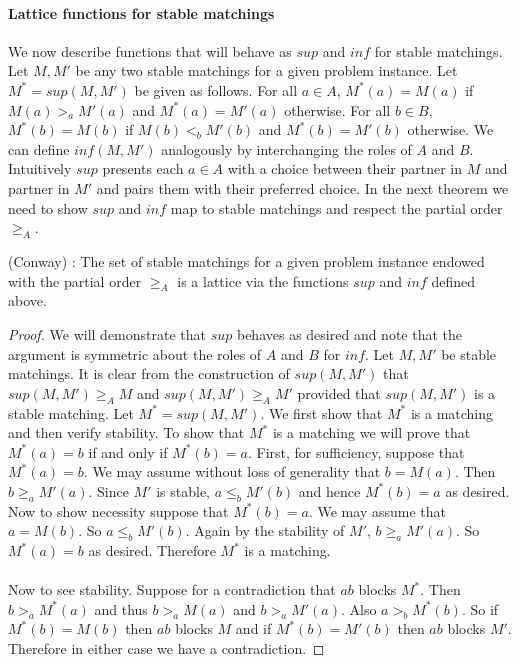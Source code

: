 \paragraph{Lattice functions for stable matchings} We now describe functions that will behave as $sup$ and $inf$ for stable matchings. Let $M, M'$ be any two stable matchings for a given problem instance. Let $M^* = sup(M,M')$ be given as follows. For all $a \in A$, $M^*(a) = M(a)$ if $M(a) >_a M'(a)$ and $M^*(a) = M'(a)$ otherwise. For all $b \in B$, $M^*(b) = M(b)$ if $M(b) <_b M'(b)$ and $M^*(b) = M'(b)$ otherwise. We can define $inf(M,M')$ analogously by interchanging the roles of $A$ and $B$. Intuitively $sup$  presents each $a \in A$ with a choice between their partner in $M$ and partner in $M'$ and pairs them with their preferred choice. In the next theorem we need to show $sup$ and $inf$ map to stable matchings and respect the partial order $\geq_A$.
\begin{theorem}(Conway)\label{theorem:lattice} \cite{knuthmariages}: The set of stable matchings for a given problem instance endowed with the partial order $\geq_A$ is a lattice via the functions $sup$ and $inf$ defined above.
\end{theorem}
\begin{proof}
We will demonstrate that $sup$ behaves as desired and note that the argument is symmetric about the roles of $A$ and $B$ for $inf$. Let $M, M'$ be stable matchings. It is clear from the construction of $sup(M,M')$ that $sup(M,M') \geq_A M$ and $sup(M,M') \geq_A M'$ provided that $sup(M,M')$ is a stable matching. Let $M^* = sup(M,M')$. We first show that $M^*$ is a matching and then verify stability. To show that $M^*$ is a matching we will prove that $M^*(a) = b$ if and only if $M^*(b) = a$. First, for sufficiency, suppose that $M^*(a) = b$.  We may assume without loss of generality that $b = M(a)$. Then $b \geq_a M'(a)$. Since $M'$ is stable, $a \leq_b M'(b)$ and hence $M^*(b) = a$ as desired. Now to show necessity suppose that $M^*(b) = a$. We may assume that $a = M(b)$. So $a \leq_b M'(b)$. Again by the stability of $M'$, $b \geq_a M'(a)$. So $M^*(a) = b$ as desired. Therefore $M^*$ is a matching. 
\paragraph{}
Now to see stability. Suppose for a contradiction that $ab$ blocks $M^*$. Then $b >_a M^*(a)$ and thus $b>_a M(a)$ and $b >_a M'(a)$. Also $a >_b M^*(b)$. So if $M^*(b) = M(b)$ then $ab$ blocks $M$ and if $M^*(b) = M'(b)$ then $ab$ blocks $M'$. Therefore in either case we have  a contradiction. \end{proof}
